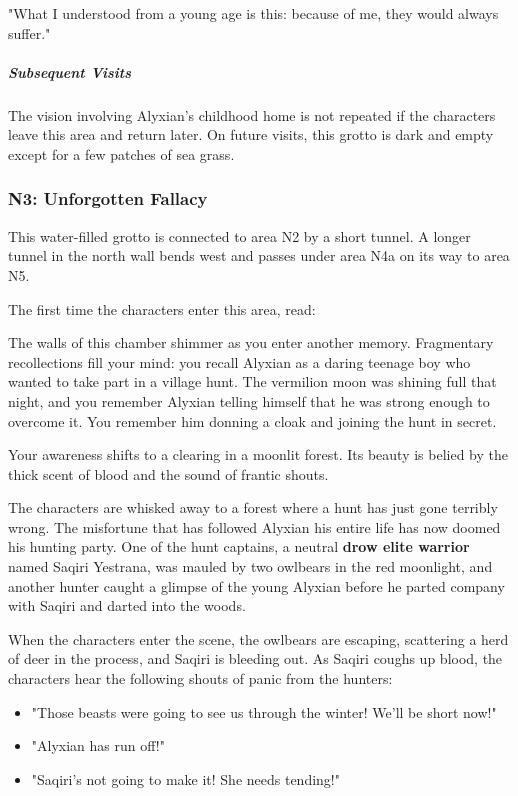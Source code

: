 \documentclass[10pt,a4paper,twoside,fancy,bg=print,twocolumn,openany,nodeprecatedcode]{dndbook}
\begin{document}
\begin{DndReadAloud}{}
"What I understood from a young age is this: because of me, they would always suffer."

\end{DndReadAloud}

\subparagraph{Subsequent Visits}
The vision involving Alyxian's childhood home is not repeated if the characters leave this area and return later. On future visits, this grotto is dark and empty except for a few patches of sea grass.

\subsubsection{N3: Unforgotten Fallacy}
This water-filled grotto is connected to area N2 by a short tunnel. A longer tunnel in the north wall bends west and passes under area N4a on its way to area N5.

The first time the characters enter this area, read:

\begin{DndReadAloud}{}
The walls of this chamber shimmer as you enter another memory. Fragmentary recollections fill your mind: you recall Alyxian as a daring teenage boy who wanted to take part in a village hunt. The vermilion moon was shining full that night, and you remember Alyxian telling himself that he was strong enough to overcome it. You remember him donning a cloak and joining the hunt in secret.

Your awareness shifts to a clearing in a moonlit forest. Its beauty is belied by the thick scent of blood and the sound of frantic shouts.

\end{DndReadAloud}

The characters are whisked away to a forest where a hunt has just gone terribly wrong. The misfortune that has followed Alyxian his entire life has now doomed his hunting party. One of the hunt captains, a neutral \textbf{drow elite warrior} named Saqiri Yestrana, was mauled by two owlbears in the red moonlight, and another hunter caught a glimpse of the young Alyxian before he parted company with Saqiri and darted into the woods.

When the characters enter the scene, the owlbears are escaping, scattering a herd of deer in the process, and Saqiri is bleeding out. As Saqiri coughs up blood, the characters hear the following shouts of panic from the hunters:


\begin{itemize}
\item "Those beasts were going to see us through the winter! We'll be short now!"
\item "Alyxian has run off!"
\item "Saqiri's not going to make it! She needs tending!"
\end{itemize}
\end{document}
